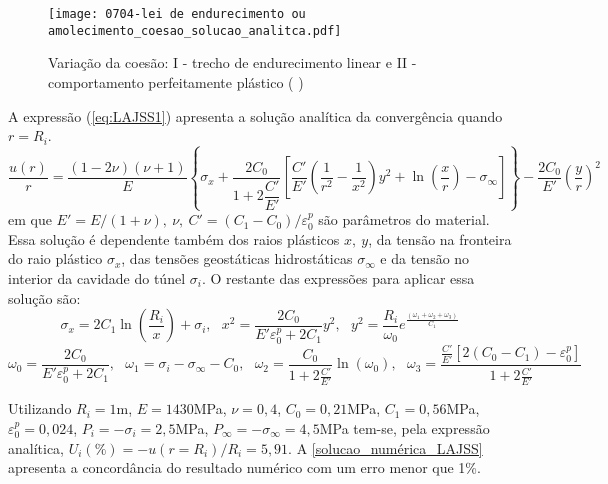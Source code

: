 \begin{figure}[H]
	\begin{center}
		\texttt{[image: 0704-lei de endurecimento ou amolecimento\_coesao\_solucao\_analitca.pdf]}
	\end{center}
	\caption{\label{coesao_solucao_analitca_LAJSS}Variação da coesão: I - trecho de endurecimento linear e II - comportamento perfeitamente plástico ( )}
\end{figure}
A expressão (\ref{eq:LAJSS1}) apresenta a solução analítica da convergência quando $r=R_i$.
\begin{equation}
	\label{eq:LAJSS1}
	\dfrac{u(r)}{r} = \dfrac{(1-2\nu)(\nu+1)}{E}\left\{\sigma_x+\dfrac{2C_0}{1+2\dfrac{C'}{E'}}\left[\dfrac{C'}{E'}\left(\dfrac{1}{r^2}-\dfrac{1}{x^2}\right) y^2+\ln{\left(\dfrac{x}{r}\right)-\sigma_\infty} \right]  \right\}-\dfrac{2C_0}{E'}\left(\dfrac{y}{r}\right)^2
\end{equation}
em que $E'=E/(1+\nu),~\nu,~C' = (C_1-C_0)/\varepsilon_0^p$ são parâmetros do material. Essa solução é dependente também dos raios plásticos $x,~y$, da tensão na fronteira do raio plástico $\sigma_x$, das tensões geostáticas hidrostáticas $\sigma_\infty$ e da tensão no interior da cavidade do túnel $\sigma_i$. O restante das expressões para aplicar essa solução são:
\begin{equation} \label{eq:LAJSS2}
	{{\sigma }_{x}}=2{{C}_{1}}\ln \left( \frac{{{R}_{i}}}{x} \right)+{{\sigma }_{i}},~~~ 	{{x}^{2}}=\frac{2{{C}_{0}}}{E'\varepsilon _{0}^{p}+2{{C}_{1}}}{{y}^{2}}, ~~~ 	{{y}^{2}}=\frac{{{R}_{i}}}{{{\omega }_{0}}}{{e}^{\frac{({{\omega }_{1}}+{{\omega }_{2}}+{{\omega }_{3}})}{{{C}_{1}}}}} 
\end{equation}
\begin{equation} \label{eq:LAJSS3}
	{{\omega }_{0}}=\frac{2{{C}_{0}}}{E'\varepsilon _{0}^{p}+2{{C}_{1}}}, ~~~ 	{{\omega }_{1}}={{\sigma }_{i}}-{{\sigma }_{\infty }}-{{C}_{0}} , ~~~ {{\omega }_{2}}=\frac{{{C}_{0}}}{1+2\frac{C'}{E'}}\ln ({{\omega }_{0}}), ~~~ 	{{\omega }_{3}}=\frac{\frac{C'}{E'}\left[ 2({{C}_{0}}-{{C}_{1}})-\varepsilon _{0}^{p} \right]}{1+2\frac{C'}{E'}}
\end{equation}

Utilizando $R_i=1$m, $E=1430$MPa, $\nu = 0,4$, $C_0=0,21$MPa, $C_1=0,56$MPa, $\varepsilon _{0}^{p}=0,024$, $P_i = -\sigma_i = 2,5$MPa, $ P_\infty = -\sigma_\infty = 4,5$MPa tem-se, pela expressão analítica, $U_i(\%) = - u(r=R_i)/R_i = 5,91$. A \autoref{solucao_numérica_LAJSS} apresenta a concordância do resultado numérico com um erro menor que 1\%.

